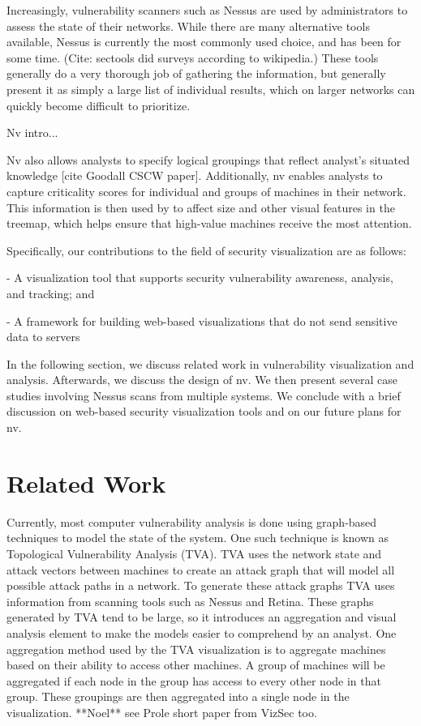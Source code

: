 \documentclass{acm_proc_article-sp}
\begin{document}
Increasingly, vulnerability scanners such as Nessus are used by administrators to assess the state of their networks.  While there are many alternative tools available, Nessus is currently the most commonly used choice, and has been for some time. (Cite: sectools did surveys according to wikipedia.)  These tools generally do a very thorough job of gathering the information, but generally present it as simply a large list of individual results, which on larger networks can quickly become difficult to prioritize.

Nv intro...

Nv also allows analysts to specify logical groupings that reflect analyst's situated knowledge [cite Goodall CSCW paper]. Additionally, nv enables analysts to capture criticality scores for individual and groups of machines in their network. This information is then used by to affect size and other visual features in the treemap, which helps ensure that high-value machines receive the most attention.

Specifically, our contributions to the field of security visualization are as follows:

- A visualization tool that supports security vulnerability awareness, analysis, and tracking; and

- A framework for building web-based visualizations that do not send sensitive data to servers

In the following section, we discuss related work in vulnerability visualization and analysis. Afterwards, we discuss the design of nv. We then present several case studies involving Nessus scans from multiple systems. We conclude with a brief discussion on web-based security visualization tools and on our future plans for nv.

\section{Related Work}

Currently, most computer vulnerability analysis is done using graph-based
techniques to model the state of the system. One such technique is known as
Topological Vulnerability Analysis (TVA). TVA uses the network state and attack
vectors between machines to create an attack graph that will model all possible attack paths in a
network. To generate these attack graphs TVA uses information from scanning
tools such as Nessus and Retina. These graphs generated by TVA tend to be 
large, so it introduces an aggregation and visual analysis element to make the
models easier to comprehend by an analyst. One aggregation method used by the TVA
visualization is to aggregate machines based on their ability to access other machines. A group of
machines will be aggregated if each node in the group has access to every other
node in that group.
These groupings are then aggregated into a single node in the visualization.
**Noel** see Prole short paper from VizSec too.
\end{document}
